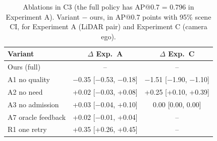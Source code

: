 \begin{table}[t]\caption{Ablations in C3 (the full policy has AP@0.7 = 0.796 in Experiment A). Variant $-$ ours, in AP@0.7 points with 95\% scene CI, for Experiment A (LiDAR pair) and Experiment C (camera ego).}\label{tab:abl}
\centering\scriptsize\setlength{\tabcolsep}{4pt}\begin{tabular}{lcc}\toprule Variant & $\Delta$ Exp.\ A & $\Delta$ Exp.\ C\\\midrule
Ours (full) & -- & --\\
A1 no quality & $-$0.35 [$-$0.53, $-$0.18] & $-$1.51 [$-$1.90, $-$1.10]\\
A2 no need & +0.02 [$-$0.03, +0.08] & +0.25 [+0.10, +0.39]\\
A3 no admission & +0.03 [$-$0.04, +0.10] & 0.00 [0.00, 0.00]\\
A7 oracle feedback & +0.02 [$-$0.01, +0.04] & --\\
R1 one retry & +0.35 [+0.26, +0.45] & --\\
\bottomrule\end{tabular}\end{table}
